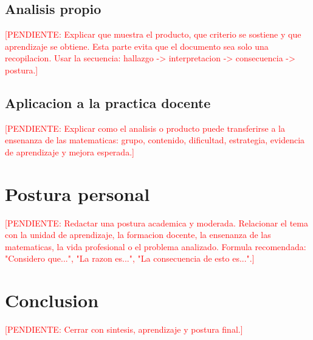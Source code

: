 \documentclass[
	spanish,
	letterpaper, oneside
]{article}
\newcommand{\pendiente}[1]{\textcolor{red}{[PENDIENTE: #1]}}
\begin{document}
\subsection{Analisis propio}

\pendiente{Explicar que muestra el producto, que criterio se sostiene y que aprendizaje se obtiene. Esta parte evita que el documento sea solo una recopilacion. Usar la secuencia: hallazgo -> interpretacion -> consecuencia -> postura.}

\subsection{Aplicacion a la practica docente}

\pendiente{Explicar como el analisis o producto puede transferirse a la ensenanza de las matematicas: grupo, contenido, dificultad, estrategia, evidencia de aprendizaje y mejora esperada.}

\section{Postura personal}

\pendiente{Redactar una postura academica y moderada. Relacionar el tema con la unidad de aprendizaje, la formacion docente, la ensenanza de las matematicas, la vida profesional o el problema analizado. Formula recomendada: "Considero que...", "La razon es...", "La consecuencia de esto es...".}

\section{Conclusion}

\pendiente{Cerrar con sintesis, aprendizaje y postura final.}



\nocite{iiiepeMAEM,iiiepeSitio}


\end{document}
